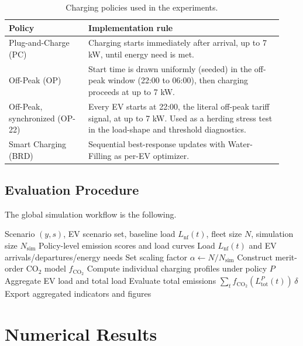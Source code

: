 \documentclass[11pt]{article}
\begin{document}
\begin{table}[H]
\centering
\caption{Charging policies used in the experiments.}
\label{tab:policies}
\begin{tabular}{p{0.27\linewidth}p{0.66\linewidth}}
\toprule
\textbf{Policy} & \textbf{Implementation rule} \\
\midrule
Plug-and-Charge (PC) & Charging starts immediately after arrival, up to 7 kW, until energy need is met. \\
Off-Peak (OP) & Start time is drawn uniformly (seeded) in the off-peak window (22:00 to 06:00), then charging proceeds at up to 7 kW. \\
Off-Peak, synchronized (OP-22) & Every EV starts at 22:00, the literal off-peak tariff signal, at up to 7 kW. Used as a herding stress test in the load-shape and threshold diagnostics. \\
Smart Charging (BRD) & Sequential best-response updates with Water-Filling as per-EV optimizer. \\
\bottomrule
\end{tabular}
\end{table}

\subsection{Evaluation Procedure}
\label{subsec:evaluation_procedure}

The global simulation workflow is the following.

\begin{algorithm}[H]
\caption{Policy Evaluation Workflow}
\label{alg:policy_eval}
\begin{algorithmic}[1]
\Require Scenario $(y,s)$, EV scenario set, baseline load $L_{\mathrm{nf}}(t)$, fleet size $N$, simulation size $N_{\mathrm{sim}}$
\Ensure Policy-level emission scores and load curves
\State Load $L_{\mathrm{nf}}(t)$ and EV arrivals/departures/energy needs
\State Set scaling factor $\alpha\gets N/N_{\mathrm{sim}}$
\State Construct merit-order CO$_2$ model $f_{\mathrm{CO}_2}$
    \State Compute individual charging profiles under policy $P$
    \State Aggregate EV load and total load
    \State Evaluate total emissions $\sum_t f_{\mathrm{CO}_2}(L_{\mathrm{tot}}^P(t))\,\delta$
\EndFor
\State Export aggregated indicators and figures
\end{algorithmic}
\end{algorithm}

\section{Numerical Results}
\label{sec:results}
\end{document}
